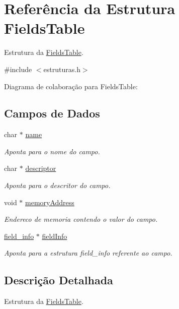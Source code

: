 \hypertarget{struct_fields_table}{}\section{Referência da Estrutura Fields\+Table}
\label{struct_fields_table}


Estrutura da \hyperlink{struct_fields_table}{Fields\+Table}.  




{\ttfamily \#include $<$estruturas.\+h$>$}



Diagrama de colaboração para Fields\+Table\+:
\subsection*{Campos de Dados}
\begin{DoxyCompactItemize}
\item 
char $\ast$ \hyperlink{struct_fields_table_a931fde572e99face7e9cd2fbc29cd36e}{name}
\begin{DoxyCompactList}\small\item\em Aponta para o nome do campo. \end{DoxyCompactList}\item 
char $\ast$ \hyperlink{struct_fields_table_aa1cd4a61abe3e42fd3d2ce8e9a692924}{descriptor}
\begin{DoxyCompactList}\small\item\em Aponta para o descritor do campo. \end{DoxyCompactList}\item 
void $\ast$ \hyperlink{struct_fields_table_a5c251342633df2e314a6b88c25f2a604}{memory\+Address}
\begin{DoxyCompactList}\small\item\em Endereco de memoria contendo o valor do campo. \end{DoxyCompactList}\item 
\hyperlink{estruturas_8h_a53c0da222997bf70321f1aebc84d8e02}{field\+\_\+info} $\ast$ \hyperlink{struct_fields_table_a0d8937ba1f6023433e234337d5825315}{field\+Info}
\begin{DoxyCompactList}\small\item\em Aponta para a estrutura field\+\_\+info referente ao campo. \end{DoxyCompactList}\end{DoxyCompactItemize}


\subsection{Descrição Detalhada}
Estrutura da \hyperlink{struct_fields_table}{Fields\+Table}. 

